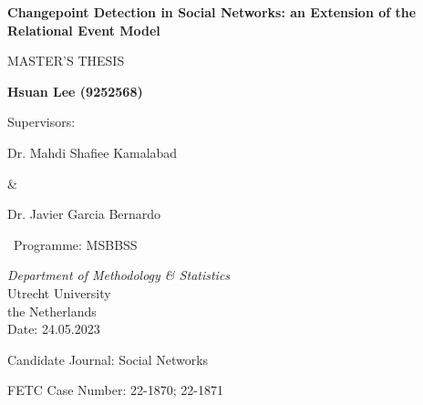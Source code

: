 \documentclass[]{interact}
\theoremstyle{plain}%
\theoremstyle{definition}
\theoremstyle{remark}
\begin{document}
	
    \begin{titlepage}
		\begin{center}
			\vspace*{1.1cm}
			
			\Huge
			\textbf{Changepoint Detection in Social Networks: an Extension of the Relational Event Model}
			
			\vspace{1.8cm}
			\LARGE
			MASTER'S THESIS
			
			\vspace{1.8cm}
			
			\textbf{Hsuan Lee (9252568)}
			
			\vspace{1cm}
			Supervisors: 
			
			\vspace{0.5cm}
			
			Dr. Mahdi Shafiee Kamalabad 
			
			\& 
			
			Dr. Javier Garcia Bernardo
			
			\vspace{2cm}
			\Large
			
			\ Programme: MSBBSS
			
			\vspace{0.3cm}
			
			\emph{Department of Methodology \& Statistics}\\
			
			\vspace{0.3cm}
			Utrecht University\\
			the Netherlands\\
			
			\vspace{1.5cm}    
			\Large
			Date: 24.05.2023
			
			Candidate Journal: Social Networks
			
			FETC Case Number: 22-1870; 22-1871
		
		\end{center}
	\end{titlepage}



	
	
	
	
\end{document}
